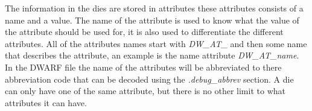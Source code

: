  


The information in the \glspl{die} are stored in attributes these attributes consists of a name and a value.
The name of the attribute is used to know what the value of the attribute should be used for, it is also used to differentiate the different attributes.
All of the attributes names start with \emph{DW\_AT\_} and then some name that describes the attribute, an example is the name attribute \emph{DW\_AT\_name}.
In the \gls{DWARF} file the name of the attributes will be abbreviated to there abbreviation code that can be decoded using the \emph{.debug\_abbrev} section.
A die can only have one of the same attribute, but there is no other limit to what attributes it can have.

